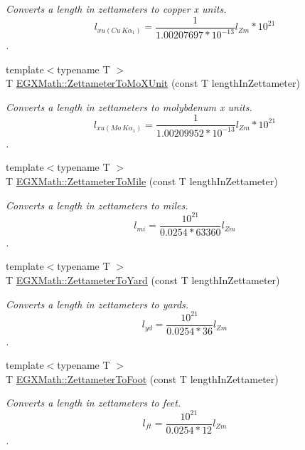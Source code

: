 \begin{DoxyCompactItemize}
\begin{DoxyCompactList}\small\item\em Converts a length in zettameters to copper x units. \[ l_{xu(Cu\ K\alpha_1)}= \frac{1}{1.00207697*10^{-13}} l_{Zm} * 10^{21}\]. \end{DoxyCompactList}\item 
{\footnotesize template$<$typename T $>$ }\\T \mbox{\hyperlink{group___e_g_x_math-_conversions-_length_conversions-_s_i-_zettameter-_non-_s_i_ga10039261b7de3417e69110a56312b9ef}{E\+G\+X\+Math\+::\+Zettameter\+To\+Mo\+X\+Unit}} (const T length\+In\+Zettameter)
\begin{DoxyCompactList}\small\item\em Converts a length in zettameters to molybdenum x units. \[ l_{xu(Mo\ K\alpha_1)}=\frac{1}{1.00209952*10^{-13}} l_{Zm} * 10^{21}\]. \end{DoxyCompactList}\item 
{\footnotesize template$<$typename T $>$ }\\T \mbox{\hyperlink{group___e_g_x_math-_conversions-_length_conversions-_s_i-_zettameter-_imperial_ga217b12dd9c920150cbcf50413e98dd47}{E\+G\+X\+Math\+::\+Zettameter\+To\+Mile}} (const T length\+In\+Zettameter)
\begin{DoxyCompactList}\small\item\em Converts a length in zettameters to miles. \[ l_{mi}=\frac{10^{21}}{0.0254 * 63360} l_{Zm} \]. \end{DoxyCompactList}\item 
{\footnotesize template$<$typename T $>$ }\\T \mbox{\hyperlink{group___e_g_x_math-_conversions-_length_conversions-_s_i-_zettameter-_imperial_gaf0f61cf5764afa5022579c2e638a0c2e}{E\+G\+X\+Math\+::\+Zettameter\+To\+Yard}} (const T length\+In\+Zettameter)
\begin{DoxyCompactList}\small\item\em Converts a length in zettameters to yards. \[ l_{yd}= \frac{10^{21}}{0.0254 * 36} l_{Zm} \]. \end{DoxyCompactList}\item 
{\footnotesize template$<$typename T $>$ }\\T \mbox{\hyperlink{group___e_g_x_math-_conversions-_length_conversions-_s_i-_zettameter-_imperial_ga2b64ad3efd85a1800a76661d05487a09}{E\+G\+X\+Math\+::\+Zettameter\+To\+Foot}} (const T length\+In\+Zettameter)
\begin{DoxyCompactList}\small\item\em Converts a length in zettameters to feet. \[ l_{ft}= \frac{10^{21}}{0.0254 * 12} l_{Zm} \]. \end{DoxyCompactList}\item 

\end{DoxyCompactItemize}
